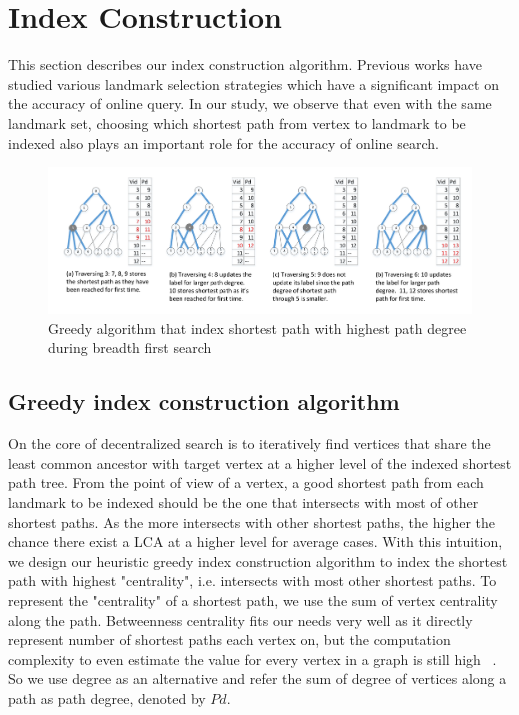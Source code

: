 \section{Index Construction}
\label{preprocessing}

This section describes our index construction algorithm. Previous works have studied various landmark selection strategies which have a significant impact on the accuracy of online query. In our study, we observe that even with the same landmark set, choosing which shortest path from vertex to landmark to be indexed also plays an important role for the accuracy of online search. 

\begin{figure}[ht]
    \centering
    \includegraphics[width=\linewidth]{./figures/new_illustrate/bfs_illustrate.pdf}
    \caption{Greedy algorithm that index shortest path with highest path degree during breadth first search}
    \label{fig:bfs_illustrate}
\end{figure}

\subsection{Greedy index construction algorithm}
On the core of decentralized search is to iteratively find vertices that share the least common ancestor with target vertex at a higher level of the indexed shortest path tree. From the point of view of a vertex, a good shortest path from each landmark to be indexed should be the one that intersects with most of other shortest paths. As the more intersects with other shortest paths, the higher the chance there exist a LCA at a higher level for average cases. With this intuition, we design our heuristic greedy index construction algorithm to index the shortest path with highest "centrality", i.e. intersects with most other shortest paths. To represent the "centrality" of a shortest path, we use the sum of vertex centrality along the path. Betweenness centrality fits our needs very well as it directly represent number of shortest paths each vertex on, but the computation complexity to even estimate the value for every vertex in a graph is still high ~\cite{Riondato:2014:FAB:2556195.2556224}. So we use degree as an alternative and refer the sum of degree of vertices along a path as path degree, denoted by $Pd$.

